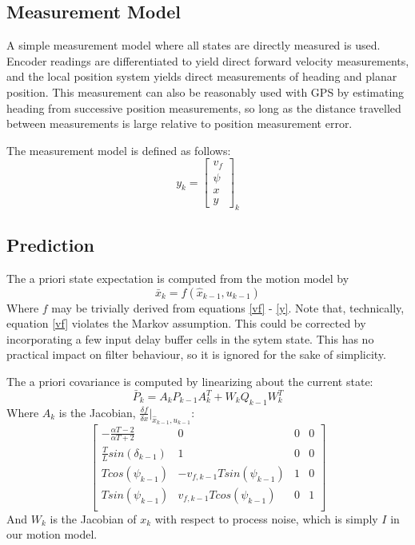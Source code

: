 \documentclass[11pt]{article} %
\begin{document}
\subsection{Measurement Model}

A simple measurement model where all states are directly measured is used.  Encoder readings are differentiated to yield direct forward velocity measurements, and the local position system yields direct measurements of heading and planar position.  This measurement can also be reasonably used with GPS by estimating heading from successive position measurements, so long as the distance travelled between measurements is large relative to position measurement error.

The measurement model is defined as follows:
\begin{equation}
y_k = \left[ \begin{array}{c} v_f \\ \psi \\ x \\ y \end{array} \right]_k
\end{equation}

\subsection{Prediction}

The a priori state expectation is computed from the motion model by
\begin{equation}
\bar{x}_k = f(\hat{x}_{k-1}, u_{k-1})
\end{equation}
Where $f$ may be trivially derived from equations \ref{vf} - \ref{y}.  Note that, technically, equation \ref{vf} violates the Markov assumption.  This could be corrected by incorporating a few input delay buffer cells in the sytem state.  This has no practical impact on filter behaviour, so it is ignored for the sake of simplicity.

The a priori covariance is computed by linearizing about the current state:
\begin{equation}
\bar{P}_k = A_kP_{k-1}A_k^T + W_kQ_{k-1}W_k^T
\end{equation}
Where $A_k$ is the Jacobian, $\frac{\delta f}{\delta x} | _{\hat{x}_{k-1}, u_{k-1}}$:
\renewcommand{\arraystretch}{1.4}
\begin{equation}
\left[ \begin{array}{cccc}
-\frac{\alpha T - 2}{\alpha T + 2} & 0 & 0 & 0 \\
\frac{T}{L} sin( \delta _{k-1} ) & 1 & 0 & 0 \\
T cos(\psi _{k-1}) & - v_{f,k-1} T sin( \psi _{k-1}) & 1 & 0 \\
T sin(\psi _{k-1}) & v_{f,k-1} T cos ( \psi _{k-1}) & 0 & 1 \\
\end{array} \right]
\end{equation}
\renewcommand{\arraystretch}{1}
And $W_k$ is the Jacobian of $x_k$ with respect to process noise, which is simply $I$ in our motion model.
\end{document}
